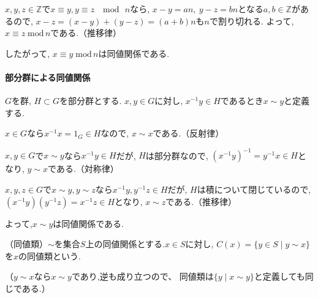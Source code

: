 $x,y,z \in \mathbb{Z}$で$x \equiv y, y\equiv z\; \mod \, n$なら,
$x-y=an,\: y-z=bn$となる$a,b \in \mathbb{Z}$があるので,
$x-z=(x-y)+(y-z)=(a+b)n$も$n$で割り切れる.
よって, $x \equiv z\;\mathrm{mod} \, n$である.（推移律）

したがって, $ x\equiv y \; \mathrm{mod}\, n$は同値関係である.\newline

\paragraph{部分群による同値関係}
$G$を群, $H \subset G$を部分群とする.
$x,y \in G$に対し, $x^{-1}y\in H$であるとき$x\sim y$と定義する.

$x\in G$なら$x^{-1}x=1_G\in H$なので, $x\sim x$である.（反射律）

$x,y \in G$で$x \sim y$なら$x^{-1}y \in H$だが,
$H$は部分群なので, $(x^{-1}y)^{-1}=y^{-1}x \in H$となり,
$y \sim x$である.（対称律）

$x,y,z \in G$で$x\sim y,y\sim z$なら$x^{-1}y,y^{-1}z \in H$だが,
$H$は積について閉じているので, $(x^{-1}y)(y^{-1}z)=x^{-1}z \in H$となり,
$x\sim z$である.（推移律）

よって,$x\sim y$は同値関係である.\newline

\begin{dfn*}
	（同値類）$\sim$を集合$S$上の同値関係とする.$x\in S$に対し,
	$C(x)=\{ y \in S \mid y\sim x \}$ を$x$の同値類という.
\end{dfn*}

（$y\sim x$なら$x \sim y$であり,逆も成り立つので、
同値類は$\{y \mid x\sim y\}$と定義しても同じである.）\newline

